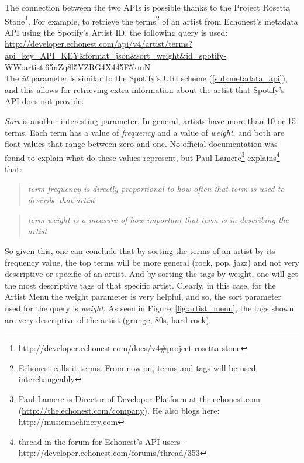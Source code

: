       The connection between the two APIs is possible thanks to the Project Rosetta Stone\footnote{\url{http://developer.echonest.com/docs/v4\#project-rosetta-stone}}.
      For example, to retrieve the terms\footnote{Echonest calls it terms. From now on, terms and tags will be used interchangeably} of an artist from Echonest's metadata API using the Spotify's Artist ID, the following query is used: \\

      \url{
        http://developer.echonest.com/api/v4/artist/terms?api_key=API_KEY&format=json&sort=weight&id=spotify-WW:artist:65nZq8l5VZRG4X445F5kmN
      } \\

      The \emph{id} parameter is similar to the Spotify's URI scheme (\ref{sub:metadata_api}), and this allows for retrieving extra information about the artist that Spotify's API does not provide.

      \emph{Sort} is another interesting parameter. 
      In general, artists have more than 10 or 15 terms.
      Each term has a value of \emph{frequency} and a value of \emph{weight}, and both are float values that range between zero and one.
      No official documentation was found to explain what do these values represent, but Paul Lamere\footnote{Paul Lamere is Director of Developer Platform at \url{the.echonest.com} (\url{http://the.echonest.com/company}). He also blogs here: \url{http://musicmachinery.com}} explains\footnote{thread in the forum for Echonest's API users - \url{http://developer.echonest.com/forums/thread/353}} that:

      \begin{quote}
      \emph{
        term frequency is directly proportional to how often that term is used to describe that artist
      }
      \end{quote}

      \begin{quote}
      \emph{
        term weight is a measure of how important that term is in describing the artist
      }
      \end{quote}

      So given this, one can conclude that by sorting the terms of an artist by its frequency value, the top terms will be more general (rock, pop, jazz) and not very descriptive or specific of an artist.
      And by sorting the tags by weight, one will get the most descriptive tags of that specific artist.
      Clearly, in this case, for the Artist Menu the weight parameter is very helpful, and so, the sort parameter used for the query is \emph{weight}.
      As seen in Figure~\ref{fig:artist_menu}, the tags shown are very descriptive of the artist (grunge, 80s, hard rock).

